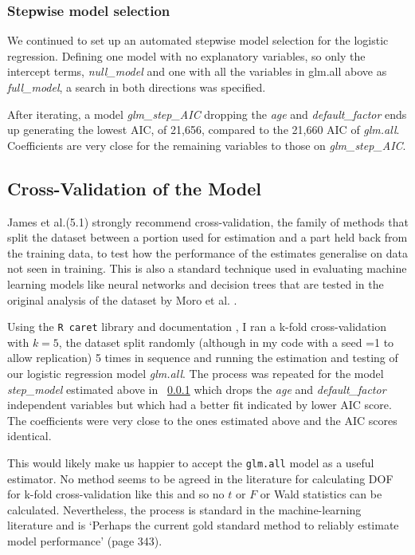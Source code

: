\documentclass[9pt,technote]{IEEEtran}
\begin{document}
\subsubsection{Stepwise model selection}
\label{subsec:step}
We continued to set up an automated stepwise model selection for the logistic regression. Defining one model with no explanatory variables, so only the intercept terms, \textit{null\_model} and one with all the variables in glm.all above as \textit{full\_model}, a search in both directions was specified.  

After iterating, a model \textit{glm\_step\_AIC} dropping the \textit{age} and \textit{default\_factor} ends up generating the lowest AIC, of 21,656, compared to the 21,660 AIC of \textit{glm.all}.  Coefficients are very close for the remaining variables to those on \textit{glm\_step\_AIC}.  

\subsection{Cross-Validation of the Model}
\label{subsec:crossval}

James et al.\cite{hastie21}(5.1) strongly recommend cross-validation, the family of methods that split the dataset between a portion used for estimation and a part held back from the training data, to test how the performance of the estimates generalise on data not seen in training.  This is also a standard technique used in evaluating machine learning models like neural networks and decision trees that are tested in the original analysis of the dataset by Moro et al. \cite{moro14}. 

Using the \texttt{R caret} library and documentation \cite{caretdocs}, I ran a k-fold cross-validation with $k=5$, the dataset split randomly (although in my code with a seed =1 to allow replication) 5 times in sequence and running the estimation and testing of our logistic regression model \textit{glm.all}.  The process was repeated for the model \textit{step\_model} estimated above in ~\ref{subsec:step} which drops the \textit{age} and \textit{default\_factor} independent variables but which had a better fit indicated by lower AIC score.  The coefficients were very close to the ones estimated above and the AIC scores identical.  

 This would likely make us happier to accept the \texttt{glm.all} model as a useful estimator. No method seems to be agreed in the literature for calculating DOF for k-fold cross-validation like this and so no $t$ or $F$ or Wald statistics can be calculated.  Nevertheless, the process is standard in the machine-learning literature and is  `Perhaps the current gold standard method to reliably estimate model performance'\cite{lantz15} (page 343).
\end{document}
